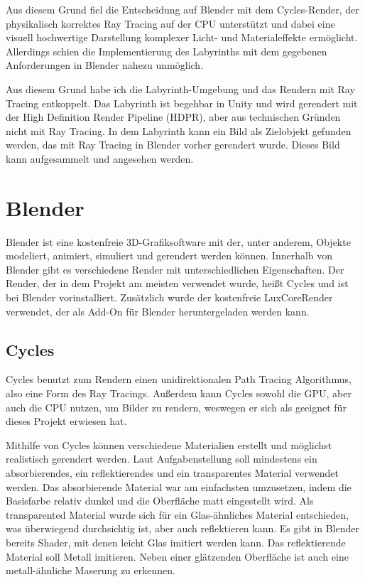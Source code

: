 \documentclass[a4paper]{article}
\begin{document}
Aus diesem Grund fiel die Entscheidung auf Blender mit dem Cycles-Render, der physikalisch korrektes Ray Tracing auf der CPU unterstützt und dabei eine visuell hochwertige Darstellung komplexer Licht- und Materialeffekte ermöglicht. Allerdings schien die Implementierung des Labyrinths mit dem gegebenen Anforderungen in Blender nahezu unmöglich. 

Aus diesem Grund habe ich die Labyrinth-Umgebung und das Rendern mit Ray Tracing entkoppelt. Das Labyrinth ist begehbar in Unity und wird gerendert mit der High Definition Render Pipeline (HDPR), aber aus technischen Gründen nicht mit Ray Tracing. In dem Labyrinth kann ein Bild als Zielobjekt gefunden werden, das mit Ray Tracing in Blender vorher gerendert wurde. Dieses Bild kann aufgesammelt und angesehen werden.

\section{Blender}
\label{sec:Blender}
Blender ist eine kostenfreie 3D-Grafiksoftware mit der, unter anderem, Objekte modeliert, animiert, simuliert und gerendert werden können. Innerhalb von Blender gibt es verschiedene Render mit unterschiedlichen Eigenschaften. Der Render, der in dem Projekt am meisten verwendet wurde, heißt Cycles und ist bei Blender vorinstalliert. Zusätzlich wurde der kostenfreie LuxCoreRender verwendet, der als Add-On für Blender heruntergeladen werden kann.

\subsection{Cycles}
Cycles benutzt zum Rendern einen unidirektionalen Path Tracing Algorithmus, also eine Form des Ray Tracings. Außerdem kann Cycles sowohl die GPU, aber auch die CPU nutzen, um Bilder zu rendern, weswegen er sich als geeignet für dieses Projekt erwiesen hat. 

Mithilfe von Cycles können verschiedene Materialien erstellt und möglichst realistisch gerendert werden. Laut Aufgabenstellung soll mindestens ein absorbierendes, ein reflektierendes und ein transparentes Material verwendet werden. Das absorbierende Material war am einfachsten umzusetzen, indem die Basisfarbe relativ dunkel und die Oberfläche matt eingestellt wird. Als transparented Material wurde sich für ein Glas-ähnliches Material entschieden, was überwiegend durchsichtig ist, aber auch reflektieren kann. Es gibt in Blender bereits Shader, mit denen leicht Glas imitiert werden kann. Das reflektierende Material soll Metall imitieren. Neben einer glätzenden Oberfläche ist auch eine metall-ähnliche Maserung zu erkennen.
\end{document}
